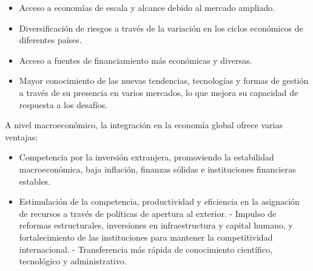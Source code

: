\documentclass[
  a4paper,
]{article}
\providecommand{\tightlist}{%
  \setlength{\itemsep}{0pt}\setlength{\parskip}{0pt}}\usepackage{longtable,booktabs,array}
\begin{document}
\begin{itemize}
\tightlist
\item
  Acceso a economías de escala y alcance debido al mercado ampliado.
\item
  Diversificación de riesgos a través de la variación en los ciclos
  económicos de diferentes países.
\item
  Acceso a fuentes de financiamiento más económicas y diversas.
\item
  Mayor conocimiento de las nuevas tendencias, tecnologías y formas de
  gestión a través de su presencia en varios mercados, lo que mejora su
  capacidad de respuesta a los desafíos.
\end{itemize}

A nivel macroeconómico, la integración en la economía global ofrece
varias ventajas:

\begin{itemize}
\tightlist
\item
  Competencia por la inversión extranjera, promoviendo la estabilidad
  macroeconómica, baja inflación, finanzas sólidas e instituciones
  financieras estables.
\item
  Estimulación de la competencia, productividad y eficiencia en la
  asignación de recursos a través de políticas de apertura al exterior.
  - Impulso de reformas estructurales, inversiones en infraestructura y
  capital humano, y fortalecimiento de las instituciones para mantener
  la competitividad internacional. - Transferencia más rápida de
  conocimiento científico, tecnológico y administrativo.
\end{itemize}
\end{document}
